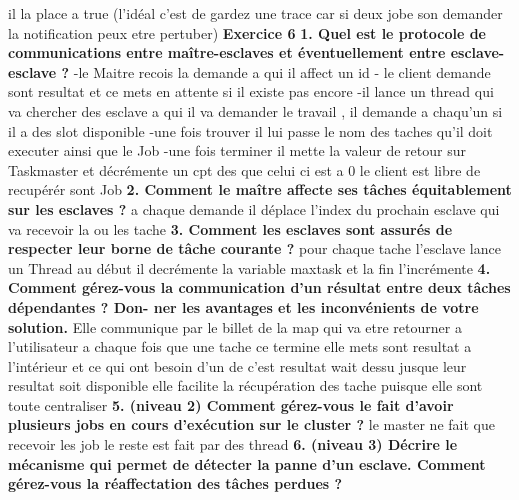 \documentclass{article}
\begin{document}
il la place a true (l'idéal c'est de gardez une trace car si deux jobe son demander la notification peux etre pertuber)
\newline
\newline
\textbf{Exercice 6}
\newline
\textbf{1. Quel est le protocole de communications entre maître-esclaves et éventuellement entre
esclave-esclave ?}
-le Maitre recois la demande a qui il affect  un id
- le client demande sont resultat et ce mets en attente si il existe pas encore
-il lance un thread qui va  chercher des  esclave a qui il va demander le travail , il demande a chaqu'un si il a des slot disponible
-une fois trouver il lui passe le nom des taches qu'il doit executer  ainsi que le Job
-une fois terminer il mette la valeur de retour sur Taskmaster et décrémente un cpt des que celui ci est a 0 le client est libre de recupérér sont Job
\newline
\newline
\textbf{2. Comment le maître affecte ses tâches équitablement sur les esclaves ?}
\newline
a chaque demande il déplace l'index du prochain esclave qui va recevoir la ou les tache 
\newline
\textbf{3. Comment les esclaves sont assurés de respecter leur borne de tâche courante ?}
\newline
pour chaque tache l'esclave lance un Thread au début il decrémente la variable maxtask et la fin l'incrémente
\newline
\textbf{4. Comment gérez-vous la communication d’un résultat entre deux tâches dépendantes ? Don-
ner les avantages et les inconvénients de votre solution.}
\newline
Elle communique par le billet de la map qui va etre retourner a l'utilisateur a chaque fois que une tache ce termine elle mets sont resultat a l'intérieur
et ce qui ont besoin d'un de c'est resultat wait dessu jusque leur resultat soit disponible
elle facilite la récupération des tache puisque elle sont toute centraliser
\newline
\textbf{5. (niveau 2) Comment gérez-vous le fait d’avoir plusieurs jobs en cours d’exécution sur le
cluster ?}
\newline
le master ne fait que recevoir les job le reste est fait par des thread
\newline
\textbf{6. (niveau 3) Décrire le mécanisme qui permet de détecter la panne d’un esclave. Comment
gérez-vous la réaffectation des tâches perdues ?}
\end{document}
